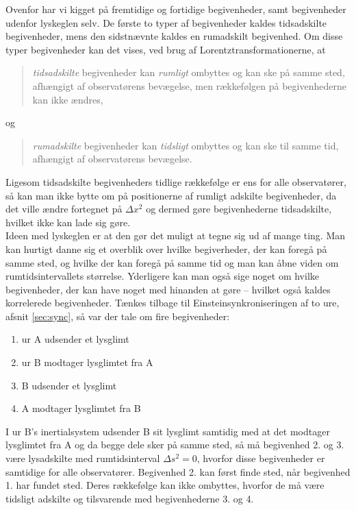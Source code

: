 Ovenfor har vi kigget på fremtidige og fortidige begivenheder, samt begivenheder udenfor lyskeglen selv. De første to typer af begivenheder kaldes tidsadskilte begivenheder, mens den sidstnævnte kaldes en rumadskilt begivenhed. Om disse typer begivenheder kan det vises, ved brug af Lorentztransformationerne, at
\begin{quote}
    \emph{tidsadskilte} begivenheder kan \emph{rumligt} ombyttes og kan ske på samme sted, afhængigt af observatørens bevægelse, men rækkefølgen på begivenhederne kan ikke ændres,
\end{quote}
og
\begin{quote}
    \emph{rumadskilte} begivenheder kan \emph{tidsligt} ombyttes og kan ske til samme tid, afhængigt af observatørens bevægelse.
\end{quote}
Ligesom tidsadskilte begivenheders tidlige rækkefølge er ens for alle observatører, så kan man ikke bytte om på positionerne af rumligt adskilte begivenheder, da det ville ændre fortegnet på $\Delta x^2$ og dermed gøre begivenhederne tidsadskilte, hvilket ikke kan lade sig gøre. \\

Ideen med lyskeglen er at den gør det muligt at tegne sig ud af mange ting. Man kan hurtigt danne sig et overblik over hvilke begiverheder, der kan foregå på samme sted, og hvilke der kan foregå på samme tid og man kan åbne viden om rumtidsintervallets størrelse. Yderligere kan man også sige noget om hvilke begivenheder, der kan have noget med hinanden at gøre -- hvilket også kaldes korrelerede begivenheder. Tænkes tilbage til Einsteinsynkroniseringen af to ure, afsnit \ref{sec:sync}, så var der tale om fire begivenheder:
\begin{enumerate}
    \item ur A udsender et lysglimt
    \item ur B modtager lysglimtet fra A
    \item B udsender et lysglimt
    \item A modtager lysglimtet fra B
\end{enumerate}
I ur B's inertialsystem udsender B sit lysglimt samtidig med at det modtager lysglimtet fra A og da begge dele sker på samme sted, så må begivenhed 2. og 3. være lysadskilte med rumtidsinterval $\Delta s^2 = 0$, hvorfor disse begivenheder er samtidige for alle observatører. Begivenhed 2. kan først finde sted, når begivenhed 1. har fundet sted. Deres rækkefølge kan ikke ombyttes, hvorfor de må være tidsligt adskilte og tilsvarende med begivenhederne 3. og 4.